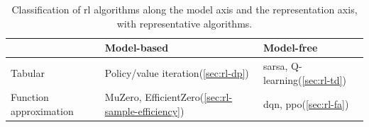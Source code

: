 
\begin{table}[htb]
  \centering
  \caption[Classification of \gls{rl} algorithms]{Classification of \gls{rl} algorithms
    along the model axis and the representation axis, with representative
    algorithms.}
  \label{tab:rl-taxonomy}
  \begin{tabularx}{\textwidth}{@{}lXX@{}}
    \toprule
    & Model-based & Model-free \\
    \midrule
    Tabular
      & Policy/value iteration\newline(\cref{sec:rl-dp})
      & \gls{sarsa}, Q-learning\newline(\cref{sec:rl-td}) \\
    \addlinespace
    Function approximation
      & MuZero, EfficientZero\newline(\cref{sec:rl-sample-efficiency})
      & \gls{dqn}, \gls{ppo}\newline(\cref{sec:rl-fa}) \\
    \bottomrule
  \end{tabularx}
\end{table}
